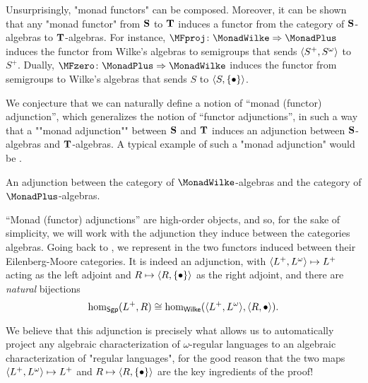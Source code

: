 Unsurprisingly, "monad functors" can be composed. Moreover, 
it can be shown that any "monad functor" from $\Monad[S]$ to $\Monad[T]$ induces
a functor from the category of $\Monad[S]$-algebras to $\Monad[T]$-algebras.
For instance, $\MFproj\colon \MonadWilke \Rightarrow \MonadPlus$ induces
the functor from Wilke's algebras to semigroups that sends $\tup{S^+,S^\omega}$
to $S^+$.
Dually, $\MFzero\colon \MonadPlus \Rightarrow \MonadWilke$ induces the functor
from semigroups to Wilke's algebras that sends $S$ to $\tup{S, \set{\bullet}}$.

We conjecture that we can naturally define a notion of ``monad (functor) adjunction'',
which generalizes the notion of ``functor adjunctions'',
in such a way that a \AP""monad adjunction"" between $\Monad[S]$ and $\Monad[T]$
induces an adjunction between $\Monad[S]$-algebras and $\Monad[T]$-algebras.
A typical example of such a "monad adjunction" would be
.

\begin{marginfigure}
	\centering
	\begin{tikzpicture}
		
	\end{tikzpicture}
	\caption{
		\AP\label{fig:adjunction-formal-finite-wilke}
		An adjunction between the category of
		$\MonadWilke$-algebras and the category of $\MonadPlus$-algebras.
	}
\end{marginfigure}
``Monad (functor) adjunctions'' are high-order objects, and so, for the sake
of simplicity, we will work with the adjunction they induce between the categories
algebras. Going back to ,
we represent in  the two functors induced
between their Eilenberg-Moore categories.
It is indeed an adjunction, with $\tup{L^+, L^\omega} \mapsto L^+$ acting as the left
adjoint and $R \mapsto \tup{R,\set{\bullet}}$ as the right adjoint, and there
are \emph{natural} bijections
\[
	\textrm{hom}_{\cat{Sgp}}(L^+, R)
	\cong \textrm{hom}_{\cat{Wilke}}(\tup{L^+,L^\omega}, \tup{R,\bullet}).
\]

We believe that this adjunction is precisely what allows us to automatically project
any algebraic characterization of $\omega$-regular languages to an algebraic
characterization of "regular languages", for the good reason that
the two maps $\tup{L^+, L^\omega} \mapsto L^+$ and $R \mapsto \tup{R,\set{\bullet}}$
are the key ingredients of the proof!

